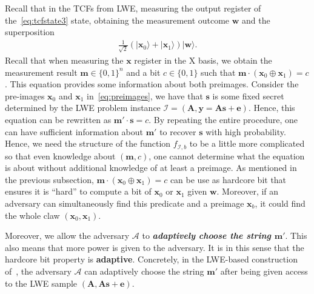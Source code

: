 \documentclass[cryptography,review,submit,pdftex,moreauthors,amsmath,amssymb,aps,strict]{Definitions/mdpi}
\begin{document}
Recall that in the TCFs from LWE, measuring the output register of the~\eqref{eq:tcfstate3} state, obtaining the measurement outcome $\mathbf{w}$ and the superposition
\begin{align}
    \frac{1}{\sqrt{2}}(|\mathbf{x}_0\rangle +|\mathbf{x}_1\rangle)|\mathbf{w}\rangle.\label{eq:lwetfcstate}
\end{align}
\noindent Recall that when measuring the $\mathbf{x}$ register in the X basis, we obtain the measurement result $\mathbf{m}\in\{0,1\}^n$ and a bit $c\in\{0,1\}$ such that $\mathbf{m}\cdot(\mathbf{x}_0\oplus\mathbf{x}_1) = c$. This equation provides some information about both preimages. Consider the pre-images $\mathbf{x}_0$ and  $\mathbf{x}_1$ in~\eqref{eq:preimages}, we have that $\mathbf{s}$ is some fixed secret determined by the LWE problem instance $\mathcal{I}=(\mathbf{A},\mathbf{y}=\mathbf{A}\mathbf{s}+\mathbf{e})$. Hence, this equation can be rewritten as $\mathbf{m}'\cdot \mathbf{s} =c$. By repeating the entire procedure, one can have sufficient information about  $\mathbf{m}'$ to recover $\mathbf{s}$ with high probability. Hence, we need the structure of the function $f_{\mathcal{I},b}$ to be a little more complicated so that even knowledge about $(\mathbf{m},c)$, one cannot determine what the equation is about without additional knowledge of at least a preimage. As mentioned in the previous subsection, $\mathbf{m}\cdot(\mathbf{x}_0\oplus\mathbf{x}_1) = c$ can be use as hardcore bit that ensures it is ``hard'' to compute a bit of $\mathbf{x}_0$ or $\mathbf{x}_1$ given $\mathbf{w}$. Moreover, if an adversary can simultaneously find this predicate and a preimage $\mathbf{x}_b$, it could find the whole claw $(\mathbf{x}_0, \mathbf{x}_1)$.



%

Moreover, we allow the adversary $\mathcal{A}$ to \textbf{\textit{adaptively choose the string $\mathbf{m}'$}}. This also means that more power is given to the adversary. It is in this sense that the hardcore bit property is \textbf{adaptive}. Concretely, in the LWE-based construction of~\cite{Brakerski18_Interactiveproofofquantumness}, the adversary $\mathcal{A}$ can adaptively choose the string $\mathbf{m}'$ after being given access to the LWE sample $(\mathbf{A},\mathbf{A}\mathbf{s}+\mathbf{e})$.
\end{document}
